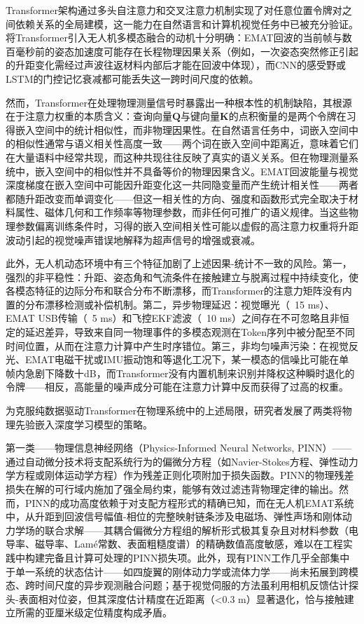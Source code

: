 Transformer架构通过多头自注意力和交叉注意力机制实现了对任意位置令牌对之间依赖关系的全局建模，这一能力在自然语言和计算机视觉任务中已被充分验证。将Transformer引入无人机多模态融合的动机十分明确：EMAT回波的当前帧与数百毫秒前的姿态加速度可能存在长程物理因果关系（例如，一次姿态突然修正引起的升距变化需经过声波往返材料内部后才能在回波中体现），而CNN的感受野或LSTM的门控记忆衰减都可能丢失这一跨时间尺度的依赖。

然而，Transformer在处理物理测量信号时暴露出一种根本性的机制缺陷，其根源在于注意力权重的本质含义：查询向量$\mathbf{Q}$与键向量$\mathbf{K}$的点积衡量的是两个令牌在习得嵌入空间中的统计相似性，而非物理因果性。在自然语言任务中，词嵌入空间中的相似性通常与语义相关性高度一致——两个词在嵌入空间中距离近，意味着它们在大量语料中经常共现，而这种共现往往反映了真实的语义关系。但在物理测量系统中，嵌入空间中的相似性并不具备等价的物理因果含义。EMAT回波能量与视觉深度梯度在嵌入空间中可能因升距变化这一共同隐变量而产生统计相关性——两者都随升距改变而单调变化——但这一相关性的方向、强度和函数形式完全取决于材料属性、磁体几何和工作频率等物理参数，而非任何可推广的语义规律。当这些物理参数偏离训练条件时，习得的嵌入空间相关性可能以虚假的高注意力权重将升距波动引起的视觉噪声错误地解释为超声信号的增强或衰减。

此外，无人机动态环境中有三个特征加剧了上述因果-统计不一致的风险。第一，强烈的非平稳性：升距、姿态角和气流条件在接触建立与脱离过程中持续变化，使各模态特征的边际分布和联合分布不断漂移，而Transformer的注意力矩阵没有内置的分布漂移检测或补偿机制。第二，异步物理延迟：视觉曝光（~15 ms）、EMAT USB传输（~5 ms）和飞控EKF滤波（~10 ms）之间存在不可忽略且非恒定的延迟差异，导致来自同一物理事件的多模态观测在Token序列中被分配至不同时间位置，从而在注意力计算中产生时序错位。第三，非均匀噪声污染：在视觉反光、EMAT电磁干扰或IMU振动饱和等退化工况下，某一模态的信噪比可能在单帧内急剧下降数十dB，而Transformer没有内置机制来识别并降权这种瞬时退化的令牌——相反，高能量的噪声成分可能在注意力计算中反而获得了过高的权重。

为克服纯数据驱动Transformer在物理系统中的上述局限，研究者发展了两类将物理先验嵌入深度学习模型的策略。

第一类——物理信息神经网络（Physics-Informed Neural Networks, PINN）——通过自动微分技术将支配系统行为的偏微分方程（如Navier-Stokes方程、弹性动力学方程或刚体运动学方程）作为残差正则化项附加于损失函数。PINN的物理残差损失在解的可行域内施加了强全局约束，能够有效过滤违背物理定律的输出。然而，PINN的成功高度依赖于对支配方程形式的精确已知，而在无人机EMAT系统中，从升距到回波信号幅值-相位的完整映射链条涉及电磁场、弹性声场和刚体动力学场的联合求解——其耦合偏微分方程组的解析形式极其复杂且对材料参数（电导率、磁导率、Lam\'{e}常数、表面粗糙度谱）的精确数值高度敏感，难以在工程实践中构建完备且计算可处理的PINN损失项。此外，现有PINN工作几乎全部集中于单一系统的状态估计——如四旋翼的刚体动力学或流体力学——尚未拓展到跨模态、跨时间尺度的异步观测融合问题；基于视觉伺服的方法虽利用相机反馈估计探头-表面相对位姿，但其深度估计精度在近距离（<0.3 m）显著退化，恰与接触建立所需的亚厘米级定位精度构成矛盾。

